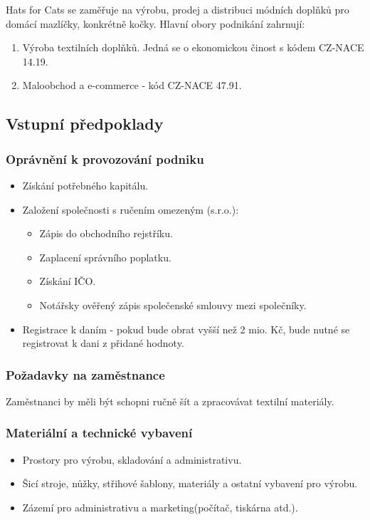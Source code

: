 \documentclass[12pt, a4paper]{article}
\begin{document}
Hats for Cats se zaměřuje na výrobu, prodej a distribuci módních doplňků pro domácí mazlíčky, konkrétně kočky. 
Hlavní obory podnikání zahrnují:

\begin{enumerate}
  \item Výroba textilních doplňků. Jedná se o ekonomickou činost s kódem CZ-NACE 14.19.
  \item Maloobchod a e-commerce - kód CZ-NACE 47.91.
\end{enumerate}

\subsection{Vstupní předpoklady}

\subsubsection{Oprávnění k provozování podniku}
\begin{itemize}
  \item Získání potřebného kapitálu.
  \item Založení společnosti s ručením omezeným (s.r.o.):
  \begin{itemize}
    \item Zápis do obchodního rejstříku.
    \item Zaplacení správního poplatku.
    \item Získání IČO.
    \item Notářsky ověřený zápis společenské smlouvy mezi společníky.
  \end{itemize}
  \item{Registrace k daním} - pokud bude obrat vyšší než 2 mio. Kč, bude nutné se registrovat k dani z přidané hodnoty.
\end{itemize}

\subsubsection{Požadavky na zaměstnance}
Zaměstnanci by měli být schopni ručně šít a zpracovávat textilní materiály.

\subsubsection{Materiální a technické vybavení}
\begin{itemize}
  \item Prostory pro výrobu, skladování a administrativu.
  \item Šicí stroje, nůžky, střihové šablony, materiály a ostatní vybavení pro výrobu.
  \item Zázemí pro administrativu a marketing(počítač, tiskárna atd.).
\end{itemize}
\end{document}
